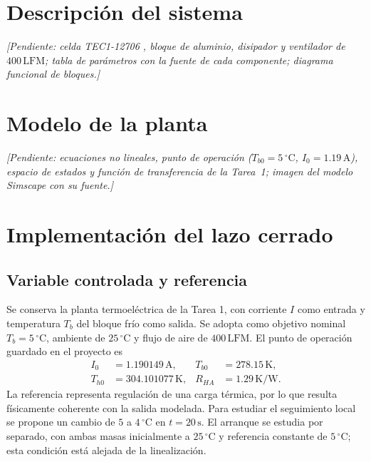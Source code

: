 \documentclass[journal,twocolumn]{IEEEtran}
\newcommand{\pendiente}[1]{\textit{[Pendiente: #1]}}
\begin{document}
\section{Descripción del sistema}
\pendiente{celda TEC1-12706 \cite{hb}, bloque de aluminio, disipador y ventilador de $400\,\mathrm{LFM}$; tabla de parámetros con la fuente de cada componente; diagrama funcional de bloques.}

\section{Modelo de la planta}
\pendiente{ecuaciones no lineales, punto de operación ($T_{b0}=5\,^\circ\mathrm C$, $I_0=1.19\,\mathrm A$), espacio de estados y función de transferencia de la Tarea~1; imagen del modelo Simscape con su fuente.}

\section{Implementación del lazo cerrado}\label{sec:lazo}
\subsection{Variable controlada y referencia}
Se conserva la planta termoeléctrica de la Tarea 1, con corriente $I$ como entrada y temperatura $T_b$ del bloque frío como salida. Se adopta como objetivo nominal $T_b=5\,{}^\circ\mathrm C$, ambiente de $25\,{}^\circ\mathrm C$ y flujo de aire de $400\,\mathrm{LFM}$. El punto de operación guardado en el proyecto es
\begin{align}
 I_0&=1.190149\,\mathrm A, &T_{b0}&=278.15\,\mathrm K,\\
 T_{h0}&=304.101077\,\mathrm K, &R_{HA}&=1.29\,\mathrm{K/W}.
\end{align}
La referencia representa regulación de una carga térmica, por lo que resulta físicamente coherente con la salida modelada. Para estudiar el seguimiento local se propone un cambio de $5$ a $4\,{}^\circ\mathrm C$ en $t=20\,\mathrm s$. El arranque se estudia por separado, con ambas masas inicialmente a $25\,{}^\circ\mathrm C$ y referencia constante de $5\,{}^\circ\mathrm C$; esta condición está alejada de la linealización.
\end{document}
